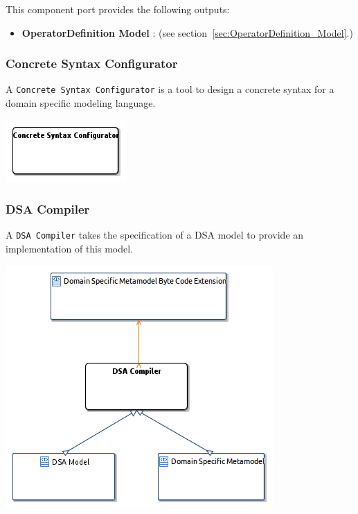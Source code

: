 \documentclass{gemoc} %
\begin{document}
This component port provides the following outputs:
\begin{itemize}
  \item \textbf{OperatorDefinition Model} :
(see section~\ref{sec:OperatorDefinition_Model}.)
\end{itemize}


\subsubsection{Concrete Syntax Configurator}
\label{sec:Concrete_Syntax_Configurator}
A \texttt{Concrete Syntax Configurator} is a tool to design a concrete syntax for a domain specific modeling language.
\begin{center}
\includegraphics*[trim=0.0cm 0.0cm 0cm 0.0cm, clip=true]{../images/generated/Generated_Concrete_Syntax_Configurator.png}
\end{center}




\subsubsection{DSA Compiler}
\label{sec:DSA_Compiler}
A \texttt{DSA Compiler} takes the specification of a DSA model to provide an implementation of this model.

\begin{center}
\includegraphics*[trim=0.0cm 0.0cm 0cm 0.0cm, clip=true]{../images/generated/Generated_DSA_Compiler.png}
\end{center}
\end{document}

